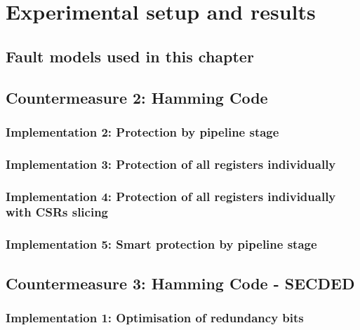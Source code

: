 \chapter{Experimental setup and results}
\label{chapter:exp_setup_results}
\minitoc

\section{Fault models used in this chapter}

\section{Countermeasure 2: Hamming Code}

    \subsection{Implementation 2: Protection by pipeline stage}

    \subsection{Implementation 3: Protection of all registers individually}

    \subsection{Implementation 4: Protection of all registers individually with CSRs slicing}

    \subsection{Implementation 5: Smart protection by pipeline stage}

\section{Countermeasure 3: Hamming Code - SECDED}

    \subsection{Implementation 1: Optimisation of redundancy bits}

